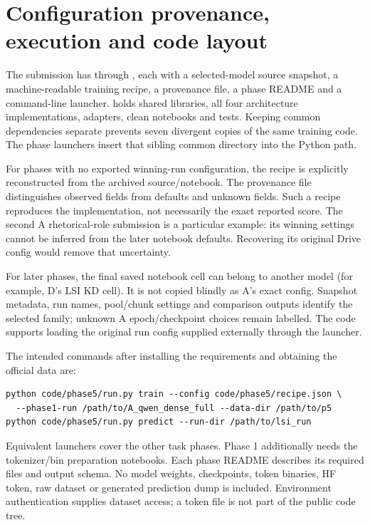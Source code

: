 \section{Configuration provenance, execution and code layout}
\label{app:configs}
The submission has  through , each with a selected-model source
snapshot, a machine-readable training recipe, a provenance file, a phase README and a command-line
launcher.  holds shared libraries, all four architecture implementations, adapters,
clean notebooks and tests. Keeping common dependencies separate prevents seven divergent copies of the
same training code. The phase launchers insert that sibling common directory into the Python path.

For phases with no exported winning-run configuration, the recipe is explicitly reconstructed from the
archived source/notebook. The provenance file distinguishes observed fields from defaults and unknown
fields. Such a recipe reproduces the implementation, not necessarily the exact reported score. The
second A rhetorical-role submission is a particular example: its winning settings cannot be inferred
from the later notebook defaults. Recovering its original Drive config would remove that uncertainty.

For later phases, the final saved notebook cell can belong to another model (for example, D's LSI KD
cell). It is not copied blindly as A's exact config. Snapshot metadata, run names, pool/chunk settings and
comparison outputs identify the selected family; unknown A epoch/checkpoint choices remain labelled.
The code supports loading the original run config supplied externally through the launcher.

The intended commands after installing the requirements and obtaining the official data are:
\begin{verbatim}
python code/phase5/run.py train --config code/phase5/recipe.json \
  --phase1-run /path/to/A_qwen_dense_full --data-dir /path/to/p5
python code/phase5/run.py predict --run-dir /path/to/lsi_run
\end{verbatim}
Equivalent launchers cover the other task phases. Phase 1 additionally needs the tokenizer/bin preparation
notebooks. Each phase README describes its required files and output schema. No model weights,
checkpoints, token binaries, HF token, raw dataset or generated prediction dump is included. Environment
authentication supplies dataset access; a token file is not part of the public code tree.

